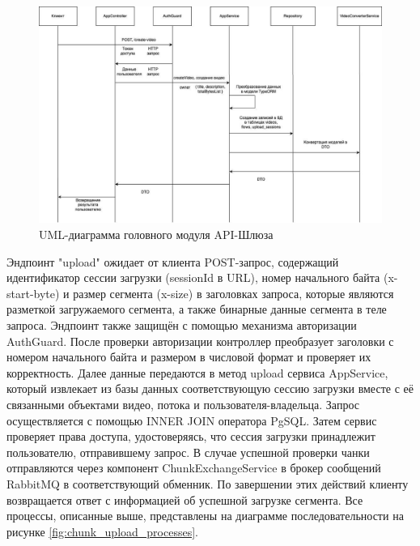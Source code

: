	\begin{figure}[ht!] 
		\center
		\includegraphics [scale=0.37] {my_folder/images//create_video_processes}
		\caption{UML-диаграмма головного модуля API-Шлюза} 
		\label{fig:create_video_processes}  
	\end{figure}

	Эндпоинт "upload" ожидает от клиента POST-запрос, содержащий идентификатор сессии загрузки (sessionId в URL), номер начального байта (x-start-byte) и размер сегмента (x-size) в заголовках запроса, которые являются разметкой загружаемого сегмента, а также бинарные данные сегмента в теле запроса. Эндпоинт также защищён с помощью механизма авторизации AuthGuard. После проверки авторизации контроллер преобразует заголовки с номером начального байта и размером в числовой формат и проверяет их корректность. Далее данные передаются в метод upload сервиса AppService, который извлекает из базы данных соответствующую сессию загрузки вместе с её связанными объектами видео, потока и пользователя-владельца. Запрос осуществляется с помощью INNER JOIN оператора PgSQL. Затем сервис проверяет права доступа, удостоверяясь, что сессия загрузки принадлежит пользователю, отправившему запрос. В случае успешной проверки чанки отправляются через компонент ChunkExchangeService в брокер сообщений RabbitMQ в соответствующий обменник. По завершении этих действий клиенту возвращается ответ с информацией об успешной загрузке сегмента. Все процессы, описанные выше, представлены на диаграмме последовательности на рисунке \ref{fig:chunk_upload_processes}.

